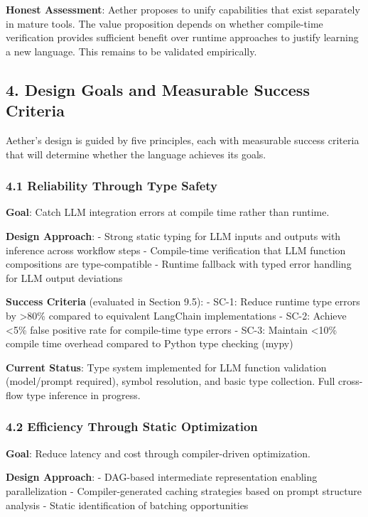 \documentclass[
]{article}
\begin{document}
\textbf{Honest Assessment}: Aether proposes to unify capabilities that
exist separately in mature tools. The value proposition depends on
whether compile-time verification provides sufficient benefit over
runtime approaches to justify learning a new language. This remains to
be validated empirically.

\subsection{4. Design Goals and Measurable Success
Criteria}\label{design-goals-and-measurable-success-criteria}

Aether's design is guided by five principles, each with measurable
success criteria that will determine whether the language achieves its
goals.

\subsubsection{4.1 Reliability Through Type
Safety}\label{reliability-through-type-safety}

\textbf{Goal}: Catch LLM integration errors at compile time rather than
runtime.

\textbf{Design Approach}: - Strong static typing for LLM inputs and
outputs with inference across workflow steps - Compile-time verification
that LLM function compositions are type-compatible - Runtime fallback
with typed error handling for LLM output deviations

\textbf{Success Criteria} (evaluated in Section 9.5): - SC-1: Reduce
runtime type errors by \textgreater80\% compared to equivalent LangChain
implementations - SC-2: Achieve \textless5\% false positive rate for
compile-time type errors - SC-3: Maintain \textless10\% compile time
overhead compared to Python type checking (mypy)

\textbf{Current Status}: Type system implemented for LLM function
validation (model/prompt required), symbol resolution, and basic type
collection. Full cross-flow type inference in progress.

\subsubsection{4.2 Efficiency Through Static
Optimization}\label{efficiency-through-static-optimization}

\textbf{Goal}: Reduce latency and cost through compiler-driven
optimization.

\textbf{Design Approach}: - DAG-based intermediate representation
enabling parallelization - Compiler-generated caching strategies based
on prompt structure analysis - Static identification of batching
opportunities
\end{document}
